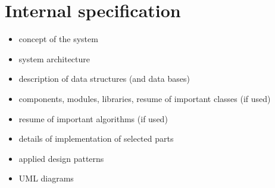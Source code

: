 \documentclass[a4paper,twoside,12pt]{book}
\begin{document}
%
%
%
%
%        


\chapter{Internal specification}

\begin{itemize}
\item concept of the system
\item system architecture
\item description of data structures (and data bases)
\item components, modules, libraries, resume of important classes (if used)
\item resume of important algorithms (if used)
\item details of implementation of selected parts
\item applied design patterns
\item UML diagrams
\end{itemize}
\end{document}
